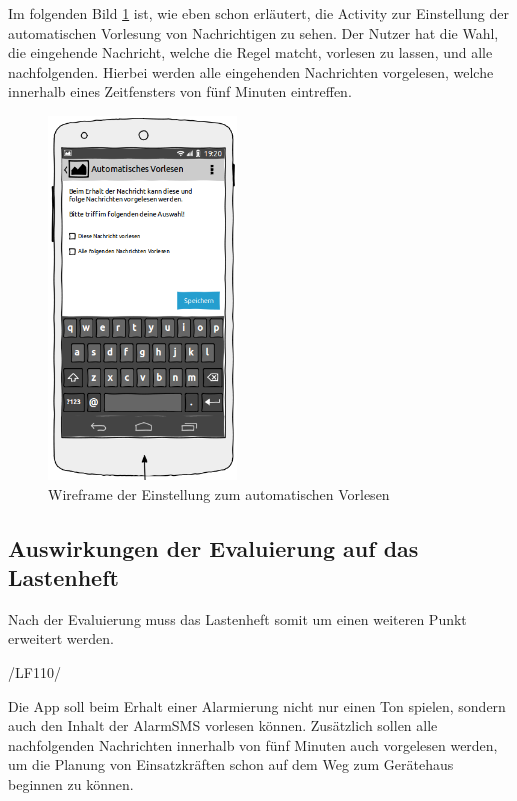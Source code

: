 Im folgenden Bild \ref{Wireframe Vorlesen} ist, wie eben schon erl\"autert, die Activity zur Einstellung der automatischen Vorlesung von Nachrichtigen zu sehen.
Der Nutzer hat die Wahl, die eingehende Nachricht, welche die Regel matcht, vorlesen zu lassen, und alle nachfolgenden. Hierbei werden alle eingehenden Nachrichten vorgelesen, welche innerhalb eines Zeitfensters von f\"unf Minuten eintreffen.
\begin{figure}[!ht]
\centering
\includegraphics[width=5cm]{Bilder/WireFrameVorlesen.png}
\caption{Wireframe der Einstellung zum automatischen Vorlesen}
\label{Wireframe Vorlesen}
\centering
\end{figure}

\subsection{Auswirkungen der Evaluierung auf das Lastenheft}
Nach der Evaluierung muss das Lastenheft somit um einen weiteren Punkt erweitert werden.

\begin{minipage}{3cm}
/LF110/
\end{minipage}
\begin{minipage}{12,2cm}
Die App soll beim Erhalt einer Alarmierung nicht nur einen Ton spielen, sondern auch den Inhalt der AlarmSMS vorlesen k\"onnen. Zus\"atzlich sollen alle nachfolgenden Nachrichten innerhalb von f\"unf Minuten auch vorgelesen werden, um die Planung von Einsatzkr\"aften schon auf dem Weg zum Ger\"atehaus beginnen zu k\"onnen.\\
\end{minipage}